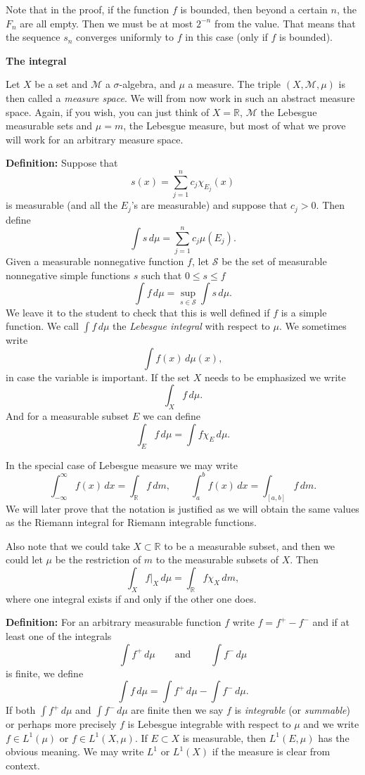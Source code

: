 \documentclass[12pt]{book}
\newcommand{\R}{{\mathbb{R}}}
\newcommand{\sM}{{\mathcal{M}}}
\newcommand{\sS}{{\mathcal{S}}}
\theoremstyle{plain}
\theoremstyle{remark}
\theoremstyle{definition}
\theoremstyle{exercise}
\theoremstyle{example}
\begin{document}
Note that in the proof, if the function $f$ is bounded, then
beyond a certain $n$, the $F_n$ are all empty.  Then we must be at most
$2^{-n}$ from the value.  That means that the sequence $s_n$ converges
uniformly to $f$ in this case (only if $f$ is bounded).

\medskip

\textbf{The integral}

\medskip

Let $X$ be a set and
$\sM$ a $\sigma$-algebra, and $\mu$ a measure.
The triple $(X,\sM,\mu)$ is then called
a \emph{measure space}.
We will from now work in such an abstract measure space.
Again, if you wish, you can
just think of $X=\R$, $\sM$ the Lebesgue measurable sets and $\mu=m$, the
Lebesgue measure, but most of what we prove will work for an arbitrary
measure space.

\textbf{Definition:}
Suppose that
$$
s(x) = \sum_{j=1}^n c_j \chi_{E_j} (x)
$$
is measurable (and all the $E_j$'s are measurable) and suppose that $c_j >
0$.  Then define
$$
\int s\, d\mu =
\sum_{j=1}^n c_j \mu(E_j) .
$$
Given a measurable nonnegative function $f$, let $\sS$ be the set
of measurable nonnegative simple functions $s$ such that $0 \leq s \leq f$
$$
\int f\, d\mu = \sup_{s \in \sS} \int s\, d\mu .
$$
We leave it to the student to check that this is well defined if $f$ is a simple
function.
We call $\int f \,d\mu$ the \emph{Lebesgue integral} with respect to $\mu$.
We sometimes write
$$
\int f(x) \,d\mu(x) ,
$$
in case the variable is important.  If the set $X$ needs to be emphasized
we write
$$
\int_X f\, d\mu .
$$
And for a measurable subset $E$ we can define
$$
\int_E f\, d\mu = \int f \chi_E\, d\mu .
$$

In the special case of Lebesgue measure we may write
$$
\int_{-\infty}^\infty f(x)\, dx = \int_\R f\, dm ,
\qquad
\int_a^b f(x)\, dx = \int_{[a,b]} f\, dm .
$$
We will later prove that the notation is justified as we will obtain
the same values as the Riemann integral for Riemann integrable functions.

Also note that we could take $X \subset \R$ to be a measurable subset, and then we could let
$\mu$ be the restriction of $m$ to the measurable subsets of $X$.  Then
$$
\int_X f|_X \, d\mu
=
\int_\R f \chi_X \, dm ,
$$
where one integral exists if and only if the other one does.

\medskip

\textbf{Definition:}
For an arbitrary measurable function $f$ write $f = f^+-f^-$ and if at least
one of the integrals
$$
\int f^+\, d\mu \qquad \text{and} \qquad
\int f^-\, d\mu 
$$
is finite, we define
$$
\int f\, d\mu =
\int f^+\, d\mu - \int f^-\, d\mu  .
$$
If both 
$\int f^+\, d\mu$ and $\int f^-\, d\mu$ are finite then we
say $f$ is \emph{integrable} (or \emph{summable}) or perhaps
more precisely $f$ is Lebesgue integrable with respect to $\mu$ and we
write $f \in L^1(\mu)$ or $f \in L^1(X,\mu)$.  If $E \subset X$ is
measurable, then $L^1(E,\mu)$ has the obvious meaning.
We may write $L^1$ or $L^1(X)$ if the measure is clear from context.
\end{document}
